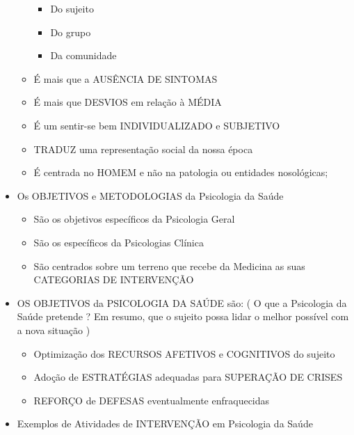 \documentclass[
]{book}
\providecommand{\tightlist}{%
  \setlength{\itemsep}{0pt}\setlength{\parskip}{0pt}}
\begin{document}
\begin{itemize}
\begin{itemize}
    \begin{itemize}
    \tightlist
    \item
      Do sujeito
    \item
      Do grupo
    \item
      Da comunidade
    \end{itemize}
  \item
    É mais que a AUSÊNCIA DE SINTOMAS
  \item
    É mais que DESVIOS em relação à MÉDIA
  \item
    É um sentir-se bem INDIVIDUALIZADO e SUBJETIVO
  \item
    TRADUZ uma representação social da nossa época
  \item
    É centrada no HOMEM e não na patologia ou entidades nosológicas;
  \end{itemize}
\item
  Os OBJETIVOS e METODOLOGIAS da Psicologia da Saúde

  \begin{itemize}
  \tightlist
  \item
    São os objetivos específicos da Psicologia Geral
  \item
    São os específicos da Psicologias Clínica
  \item
    São centrados sobre um terreno que recebe da Medicina as suas
    CATEGORIAS DE INTERVENÇÃO
  \end{itemize}
\item
  OS OBJETIVOS da PSICOLOGIA DA SAÚDE são: ( O que a Psicologia da Saúde
  pretende ? Em resumo, que o sujeito possa lidar o melhor possível com
  a nova situação )

  \begin{itemize}
  \tightlist
  \item
    Optimização dos RECURSOS AFETIVOS e COGNITIVOS do sujeito
  \item
    Adoção de ESTRATÉGIAS adequadas para SUPERAÇÃO DE CRISES
  \item
    REFORÇO de DEFESAS eventualmente enfraquecidas
  \end{itemize}
\item
  Exemplos de Atividades de INTERVENÇÃO em Psicologia da Saúde


\end{itemize}
\end{document}
